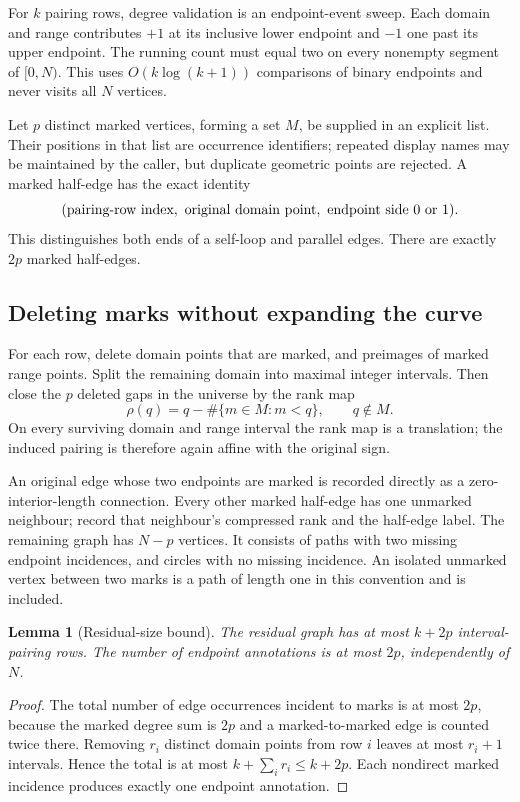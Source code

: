 \documentclass[11pt,letterpaper]{article}
\newtheorem{lemma}[theorem]{Lemma}
\theoremstyle{definition}
\theoremstyle{remark}
\begin{document}
For $k$ pairing rows, degree validation is an endpoint-event sweep. Each
domain and range contributes $+1$ at its inclusive lower endpoint and $-1$
one past its upper endpoint. The running count must equal two on every
nonempty segment of $[0,N)$. This uses $O(k\log(k+1))$ comparisons of
binary endpoints and never visits all $N$ vertices.

Let $p$ distinct marked vertices, forming a set $M$, be supplied in an
explicit list. Their
positions in that list are occurrence identifiers; repeated display names
may be maintained by the caller, but duplicate geometric points are
rejected. A marked half-edge has the exact identity
\[
 (\hbox{pairing-row index},\ \hbox{original domain point},\
   \hbox{endpoint side }0\hbox{ or }1).
\]
This distinguishes both ends of a self-loop and parallel edges. There are
exactly $2p$ marked half-edges.

\subsection{Deleting marks without expanding the curve}

For each row, delete domain points that are marked, and preimages of
marked range points. Split the remaining domain into maximal integer
intervals. Then close the $p$ deleted gaps in the universe by the rank map
\[
 \rho(q)=q-\#\{m\in M:m<q\},\qquad q\notin M.
\]
On every surviving domain and range interval the rank map is a translation;
the induced pairing is therefore again affine with the original sign.

An original edge whose two endpoints are marked is recorded directly as
a zero-interior-length connection. Every other marked half-edge has one
unmarked neighbour; record that neighbour's compressed rank and the
half-edge label. The remaining graph has $N-p$ vertices. It consists of
paths with two missing endpoint incidences, and circles with no missing
incidence. An isolated unmarked vertex between two marks is a path of
length one in this convention and is included.

\begin{lemma}[Residual-size bound]
\label{lem:residual}
The residual graph has at most $k+2p$ interval-pairing rows. The number
of endpoint annotations is at most $2p$, independently of $N$.
\end{lemma}
\begin{proof}
The total number of edge occurrences incident to marks is at most $2p$,
because the marked degree sum is $2p$ and a marked-to-marked edge is
counted twice there. Removing $r_i$ distinct domain points from row $i$
leaves at most $r_i+1$ intervals. Hence the total is at most
$k+\sum_i r_i\le k+2p$. Each nondirect marked incidence produces exactly
one endpoint annotation.
\end{proof}
\end{document}
